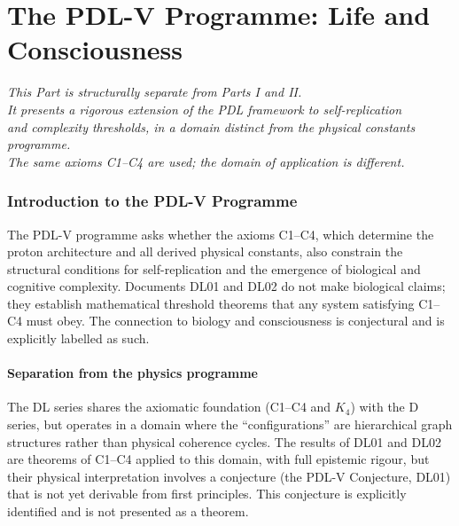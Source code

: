 \documentclass[11pt,a4paper]{article}
\theoremstyle{plain}
\theoremstyle{definition}
\theoremstyle{remark}
\begin{document}
\newpage
\part{The PDL-V Programme: Life and Consciousness}
\label{part:PDL-V}

\begin{center}
\textit{This Part is structurally separate from Parts I and II.\\
It presents a rigorous extension of the PDL framework to self-replication\\
and complexity thresholds, in a domain distinct from the physical constants programme.\\
The same axioms C1--C4 are used; the domain of application is different.}
\end{center}

\vspace{1em}

\section{Introduction to the PDL-V Programme}
\label{sec:PDLV_intro}

The PDL-V programme asks whether the axioms C1--C4, which determine the proton architecture and all derived physical constants, also constrain the structural conditions for self-replication and the emergence of biological and cognitive complexity. Documents DL01 and DL02 do not make biological claims; they establish mathematical threshold theorems that any system satisfying C1--C4 must obey. The connection to biology and consciousness is conjectural and is explicitly labelled as such.

\subsection{Separation from the physics programme}

The DL series shares the axiomatic foundation (C1--C4 and $K_4$) with the D series, but operates in a domain where the ``configurations'' are hierarchical graph structures rather than physical coherence cycles. The results of DL01 and DL02 are theorems of C1--C4 applied to this domain, with full epistemic rigour, but their physical interpretation involves a conjecture (the PDL-V Conjecture, DL01) that is not yet derivable from first principles. This conjecture is explicitly identified and is not presented as a theorem.
\end{document}
